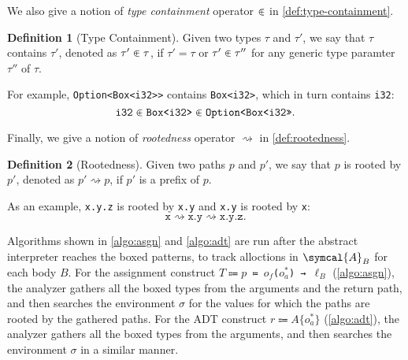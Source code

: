 \documentclass[en]{snu-ece-bsc-thesis}
\theoremstyle{definition}
\newtheorem{definition}{Definition}
\begin{document}
We also give a notion of \emph{type containment} operator $\inplus$ in \autoref{def:type-containment}.
\begin{definition}[Type Containment]\label{def:type-containment}
  Given two types $\tau$ and $\tau'$, we say that $\tau$ contains $\tau'$, denoted as $\tau' \inplus \tau$, if $\tau' = \tau$ or $\tau' \inplus \tau''$ for any generic type paramter $\tau''$ of $\tau$.
\end{definition}
For example, \verb/Option<Box<i32>>/ contains \verb/Box<i32>/, which in turn contains \verb/i32/: \[\texttt{i32} \inplus \texttt{Box<i32>} \inplus \texttt{Option<Box<i32>>}.\]

Finally, we give a notion of \emph{rootedness} operator $\rightsquigarrow$ in \autoref{def:rootedness}.
\begin{definition}[Rootedness]\label{def:rootedness}
  Given two paths $p$ and $p'$, we say that $p$ is rooted by $p'$, denoted as $p' \rightsquigarrow p$, if $p'$ is a prefix of $p$.
\end{definition}
As an example, \verb/x.y.z/ is rooted by \verb/x.y/ and \verb/x.y/ is rooted by \verb/x/: \[\texttt{x} \rightsquigarrow \texttt{x.y} \rightsquigarrow \texttt{x.y.z}.\]

Algorithms shown in \autoref{algo:asgn} and \autoref{algo:adt} are run after the abstract interpreter reaches the boxed patterns, to track alloctions in $\symcal{A}_B$ for each body $B$.
For the assignment construct \texttt{$T \Coloneqq p$ ≔ $o_f$($o_a^*$) → $\ell_B$} (\autoref{algo:asgn}), the analyzer gathers all the boxed types from the arguments and the return path, and then searches the environment $\sigma$ for the values for which the paths are rooted by the gathered paths.
For the ADT construct \texttt{$r \Coloneqq A\{o_a^*\}$} (\autoref{algo:adt}), the analyzer gathers all the boxed types from the arguments, and then searches the environment $\sigma$ in a similar manner.
\end{document}
